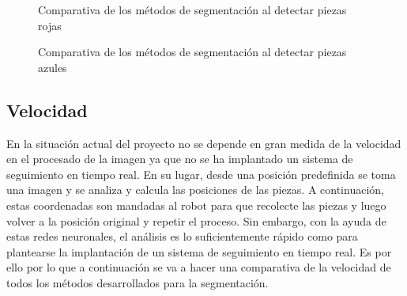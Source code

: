 \begin{figure}[ht]  %
\vspace{-30pt}
  \hfill	
\caption{Comparativa de los métodos de segmentación al detectar piezas rojas}
\label{fig:red resultados}
\vspace{-5pt}
\end{figure}

\begin{figure}[ht]  %
\vspace{-30pt}
  \hfill	
\caption{Comparativa de los métodos de segmentación al detectar piezas azules}
\label{fig:blue resultados}
\vspace{-5pt}
\end{figure}

\newpage
\subsection{Velocidad}
En la situación actual del proyecto no se depende en gran medida de la velocidad en el procesado de la imagen ya que no se ha implantado un sistema de seguimiento en tiempo real. En su lugar, desde una posición predefinida se toma una imagen y se analiza y calcula las posiciones de las piezas. A continuación, estas coordenadas son mandadas al robot para que recolecte las piezas y luego volver a la posición original y repetir el proceso. Sin embargo, con la ayuda de estas redes neuronales, el análisis es lo suficientemente rápido como para plantearse la implantación de un sistema de seguimiento en tiempo real. Es por ello por lo que a continuación se va a hacer una comparativa de la velocidad de todos los métodos desarrollados para la segmentación.


